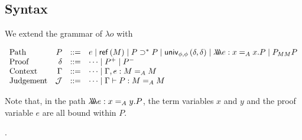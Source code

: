 
\subsection{Syntax}

We extend the grammar of $\lambda o$ with

\[
\begin{array}{lrcl}
\text{Path} & P & ::= & e \mid \mathsf{ref} \left( {M} \right) \mid P \supset^* P \mid \mathsf{univ}_{{\phi} , {\phi}} \left( {\delta} , {\delta} \right) \mid \lambda \!\! \lambda \!\! \lambda e : x =_A x . P \mid P_{MM} P\\
\text{Proof} & \delta & ::= & \cdots \mid P^+ \mid P^- \\
\text{Context} & \Gamma & ::= & \cdots \mid \Gamma, e : M =_A M \\
\text{Judgement} & \mathcal{J} & ::= & \cdots \mid \Gamma \vdash P : M =_A M
\end{array}
\]

Note that, in the path $\lambda \!\! \lambda \!\! \lambda e : x =_A y . P$, the term variables $x$ and $y$ and the proof variable $e$ are all bound within $P$.

.


